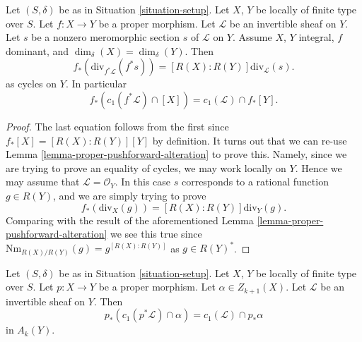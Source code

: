 \begin{lemma}
\label{lemma-equal-c1-as-cycles}
Let $(S, \delta)$ be as in Situation \ref{situation-setup}.
Let $X$, $Y$ be locally of finite type over $S$.
Let $f : X \to Y$ be a proper morphism.
Let $\mathcal{L}$ be an invertible sheaf on $Y$.
Let $s$ be a nonzero meromorphic section $s$ of $\mathcal{L}$ on $Y$.
Assume $X$, $Y$ integral, $f$ dominant, and $\dim_\delta(X) = \dim_\delta(Y)$.
Then
$$
f_*\left(\text{div}_{f^*\mathcal{L}}(f^*s)\right) =
[R(X) : R(Y)]\text{div}_\mathcal{L}(s).
$$
as cycles on $Y$. In particular
$$
f_*(c_1(f^*\mathcal{L}) \cap [X]) = c_1(\mathcal{L}) \cap f_*[Y].
$$
\end{lemma}

\begin{proof}
The last equation follows from the first since $f_*[X] = [R(X) : R(Y)][Y]$
by definition. It turns out that we can re-use
Lemma \ref{lemma-proper-pushforward-alteration}
to prove this. Namely, since we are trying to prove an equality
of cycles, we may work locally on $Y$. Hence we may assume
that $\mathcal{L} = \mathcal{O}_Y$. In this case $s$
corresponds to a rational function $g \in R(Y)$, and
we are simply trying to prove
$$
f_*\left(\text{div}_X(g)\right) =
[R(X) : R(Y)]\text{div}_Y(g).
$$
Comparing with the result of the aforementioned
Lemma \ref{lemma-proper-pushforward-alteration}
we see this true since
$\text{Nm}_{R(X)/R(Y)}(g) = g^{[R(X) : R(Y)]}$
as $g \in R(Y)^*$.
\end{proof}

\begin{lemma}
\label{lemma-pushforward-cap-c1}
Let $(S, \delta)$ be as in Situation \ref{situation-setup}.
Let $X$, $Y$ be locally of finite type over $S$.
Let $p : X \to Y$ be a proper morphism.
Let $\alpha \in Z_{k + 1}(X)$.
Let $\mathcal{L}$ be an invertible sheaf on $Y$.
Then
$$
p_*(c_1(p^*\mathcal{L}) \cap \alpha) = c_1(\mathcal{L}) \cap p_*\alpha
$$
in $A_k(Y)$.
\end{lemma}

